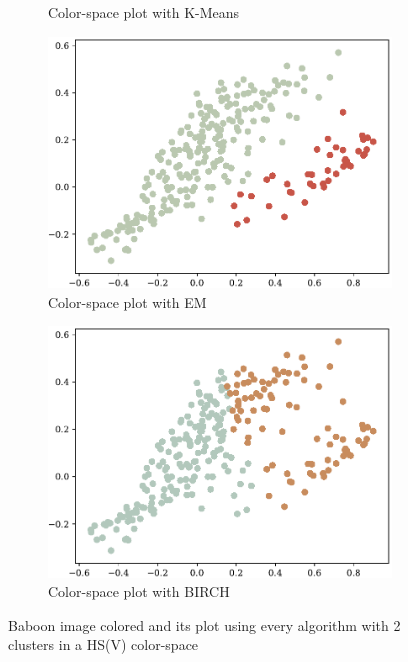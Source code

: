 \documentclass[sigconf,authorversion]{acmart}
\begin{document}
\begin{figure}[hbtp]
\begin{subfigure}[b]{0.25\textwidth}
      \caption{Color-space plot with K-Means}
      \label{subfig:p_baboon_hsv_kmeans}
  \end{subfigure}
  \hspace{0.05\textwidth}
  \begin{subfigure}[b]{0.25\textwidth}
      \includegraphics[width=\textwidth]{../outputs/baboon_2_hsv_plot_gmm.pdf}
      \caption{Color-space plot with EM}
      \label{subfig:p_baboon_hsv_gmm}
  \end{subfigure}
  \hspace{0.05\textwidth}
  \begin{subfigure}[b]{0.25\textwidth}
      \includegraphics[width=\textwidth]{../outputs/baboon_2_hsv_plot_birch.pdf}
      \caption{Color-space plot with BIRCH}
      \label{subfig:p_baboon_hsv_birch}
  \end{subfigure}
  \caption{Baboon image colored and its plot using every algorithm with 2 clusters in a HS(V) color-space}
  \label{fig:baboon_2_hsv}
\end{figure}
\end{document}
